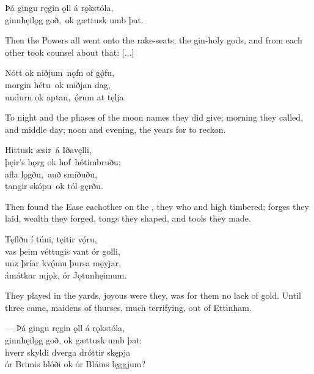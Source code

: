 \bva Þá gingu ręgin ǫll \hld á rǫkstóla, \\%
ginnhęilǫg goð, \hld ok gættusk umb þat.\footnotemark[1]\eva
{}

\bvb Then the Powers all went onto the rake-seats, the gin-holy gods, and from each other took counsel about that: [...]\evb

\bva Nótt ok niðjum \hld nǫfn of gǫ́fu, \\%
morgin hétu \hld ok miðjan dag, \\%
undurn ok aptan, \hld ǫ́rum at tęlja.\footnotemark[1]\eva
{}

\bvb To night and the phases of the moon names they did give; morning they called, and middle day; noon and evening, the years for to reckon.\evb

\bva Hittusk æsir \hld á Iðavęlli, \\%
þęir’s hǫrg ok hof \hld hótimbruðu; \\%
afla lǫgðu, \hld auð smíðuðu, \\%
tangir skópu \hld ok tól gęrðu.\eva

\bvb Then found the Ease eachother on the , they who  and  high timbered; forges they laid, wealth they forged, tongs they shaped, and tools they made.\evb

\bva Tęflðu í túni, \hld tęitir vǫ́ru, \\%
vas þeim véttugis \hld vant ór golli, \\%
unz þríar kvǫ́mu \hld þursa męyjar, \\%
ámátkar mjǫk, \hld ór Jǫtunhęimum.\eva

\bvb They played  in the yards, joyous were they, was for them no lack of gold. Until three came, maidens of thurses, much terrifying, out of Ettinham.\footnotemark[1]\evb
{}


\bva — Þá gingu ręgin ǫll \hld á rǫkstóla, \\%
ginnhęilǫg goð, \hld ok gættusk umb þat: \\%
hverr skyldi dverga \hld dróttir skępja \\%
ór Brimis blóði \hld ok ór Bláins lęggjum?\footnotemark[1]\eva
{}

